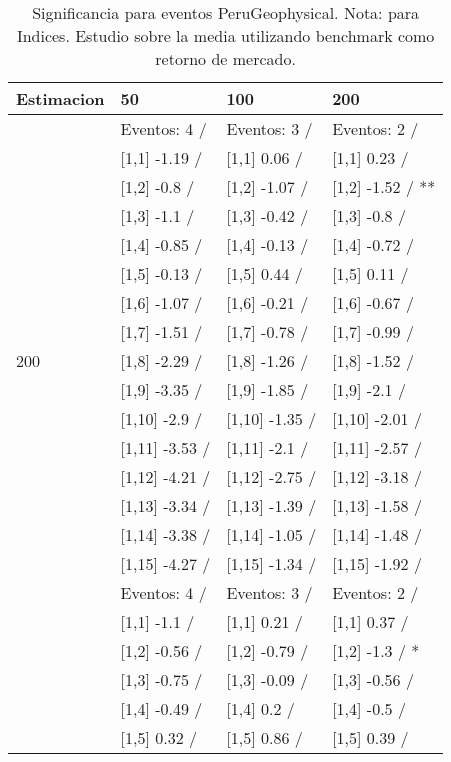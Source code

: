 \begin{table}

\caption{Significancia para eventos PeruGeophysical. Nota: para Indices. Estudio sobre la media utilizando benchmark como retorno de mercado.}
\centering
\begin{tabular}[t]{llll}
\toprule
Estimacion & 50 & 100 & 200\\
\midrule
 & Eventos:  4 / & Eventos:  3 / & Eventos:  2 /\\
 & {}[1,1] -1.19  / & {}[1,1] 0.06  / & {}[1,1] 0.23  /\\
 & {}[1,2] -0.8  / & {}[1,2] -1.07  / & {}[1,2] -1.52  / **\\
 & {}[1,3] -1.1  / & {}[1,3] -0.42  / & {}[1,3] -0.8  /\\
 & {}[1,4] -0.85  / & {}[1,4] -0.13  / & {}[1,4] -0.72  /\\
\addlinespace
 & {}[1,5] -0.13  / & {}[1,5] 0.44  / & {}[1,5] 0.11  /\\
 & {}[1,6] -1.07  / & {}[1,6] -0.21  / & {}[1,6] -0.67  /\\
 & {}[1,7] -1.51  / & {}[1,7] -0.78  / & {}[1,7] -0.99  /\\
200 & {}[1,8] -2.29  / & {}[1,8] -1.26  / & {}[1,8] -1.52  /\\
 & {}[1,9] -3.35  / & {}[1,9] -1.85  / & {}[1,9] -2.1  /\\
\addlinespace
 & {}[1,10] -2.9  / & {}[1,10] -1.35  / & {}[1,10] -2.01  /\\
 & {}[1,11] -3.53  / & {}[1,11] -2.1  / & {}[1,11] -2.57  /\\
 & {}[1,12] -4.21  / & {}[1,12] -2.75  / & {}[1,12] -3.18  /\\
 & {}[1,13] -3.34  / & {}[1,13] -1.39  / & {}[1,13] -1.58  /\\
 & {}[1,14] -3.38  / & {}[1,14] -1.05  / & {}[1,14] -1.48  /\\
\addlinespace
 & {}[1,15] -4.27  / & {}[1,15] -1.34  / & {}[1,15] -1.92  /\\
 & Eventos:  4 / & Eventos:  3 / & Eventos:  2 /\\
 & {}[1,1] -1.1  / & {}[1,1] 0.21  / & {}[1,1] 0.37  /\\
 & {}[1,2] -0.56  / & {}[1,2] -0.79  / & {}[1,2] -1.3  / *\\
 & {}[1,3] -0.75  / & {}[1,3] -0.09  / & {}[1,3] -0.56  /\\
\addlinespace
 & {}[1,4] -0.49  / & {}[1,4] 0.2  / & {}[1,4] -0.5  /\\
 & {}[1,5] 0.32  / & {}[1,5] 0.86  / & {}[1,5] 0.39  /\\

\end{tabular}
\end{table}
